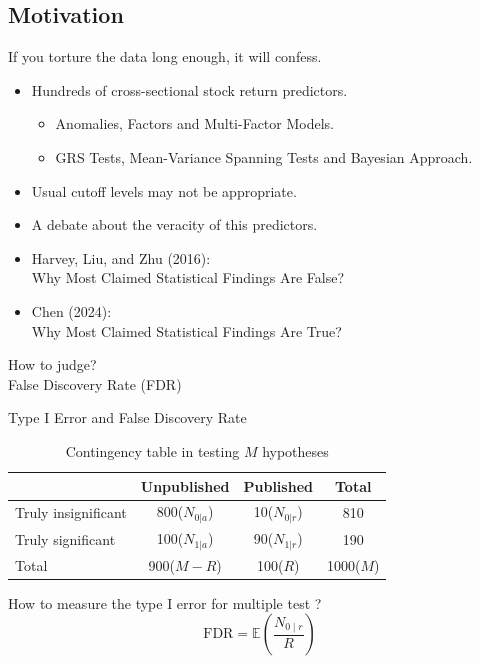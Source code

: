 \documentclass[UTF8, 16pt]{beamer}
\begin{document}
\begin{CJK*}{UTF8}{gbsn}
\section{Motivation}
\begin{frame}{If you torture the data long enough, it will confess.}
	\begin{itemize}
		\item \alert{Hundreds} of cross-sectional stock return \alert{predictors}.
			\begin{itemize}
				\item Anomalies, Factors and Multi-Factor Models.
				\item GRS Tests, Mean-Variance Spanning Tests and Bayesian Approach.
			\end{itemize}
		\item \alert{Usual cutoff levels} may not be \alert{appropriate}.
		\item A \alert{debate} about the veracity of this predictors.
	\end{itemize}
	\begin{itemize}
		\item Harvey, Liu, and Zhu (2016):
			\\
			Why Most Claimed Statistical Findings Are \alert{False}?
		\item Chen (2024):
			\\
			Why Most Claimed Statistical Findings Are \alert{True}?
	\end{itemize}
	\begin{center}
		How to judge?\\
		\alert{False Discovery Rate (FDR)}
	\end{center}
\end{frame}
\begin{frame}{Type I Error and False Discovery Rate}
	\begin{table}
	    \centering
	    \caption{Contingency table in testing $M$ hypotheses}
	    \vspace{-0.5cm}
	    \setlength{\tabcolsep}{2mm}
		    {
		    \begin{tabular}{lccc}
		    \hline
	         & Unpublished & Published & Total\\ \hline
	        Truly insignificant & 800($N_{0|a}$) & \alert{10($N_{0|r}$)} & 810\\ 
	        Truly significant & 100($N_{1|a}$) & 90($N_{1|r}$) & 190\\
	        Total & 900($M-R$) & 100($R$) & 1000($M$)\\ \hline
		    \end{tabular}
		    }
	    \label{fig1}
	\end{table}
	\begin{center}
		How to measure the \alert{type I error} for multiple test ?
		$$
		\mathrm{FDR} = \mathbb{E}(\frac{N_{0 \mid r}}{R})
		$$
	\end{center}
\end{frame}


\end{CJK*}
\end{document}
